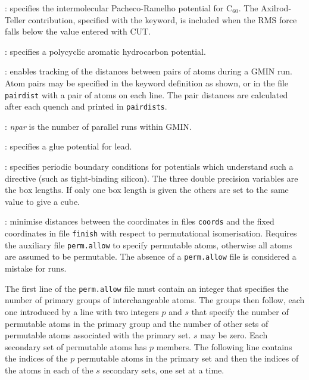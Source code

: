 : specifies the intermolecular Pacheco-Ramelho potential for C$_{60}$.
The Axilrod-Teller contribution, specified with the {\/} keyword, is included
when the RMS force falls below the value entered with {CUT\/}.

: specifies a polycyclic aromatic hydrocarbon potential.

: enables tracking of the distances between pairs of atoms during a GMIN run. Atom pairs may
be specified in the keyword definition as shown, or in the file {\tt pairdist} with a pair of atoms on each line. The pair distances are
calculated after each quench and printed in {\tt pairdists}.

: {\it npar\/} is the number of parallel runs within GMIN.

: specifies a glue potential for lead.

: specifies periodic boundary conditions for
potentials which understand such a directive (such as tight-binding silicon). The three
double precision variables are the box lengths. If only one box length is given the
others are set to the same value to give a cube.

: minimise distances between 
the coordinates in files {\tt coords} and the
fixed coordinates in file {\tt finish} with respect to permutational isomerisation.
Requires the auxiliary file {\tt perm.allow} to specify permutable atoms, otherwise
all atoms are assumed to be permutable. The absence of a {\tt perm.allow}
file is considered a mistake for {\/} runs.

The first line of the {\tt perm.allow} file must contain an integer
that specifies the number of primary groups of interchangeable atoms.
The groups then follow, each one introduced by a line with two integers $p$ and $s$
that specify the number of permutable atoms in the primary group and the number of other sets
of permutable atoms associated with the primary set.
$s$ may be zero.
Each secondary set of permutable atoms has $p$ members.
The following line contains the indices of the $p$ permutable atoms 
in the primary set and then
the indices of the atoms in each of the $s$ secondary sets, one set at 
a time.


